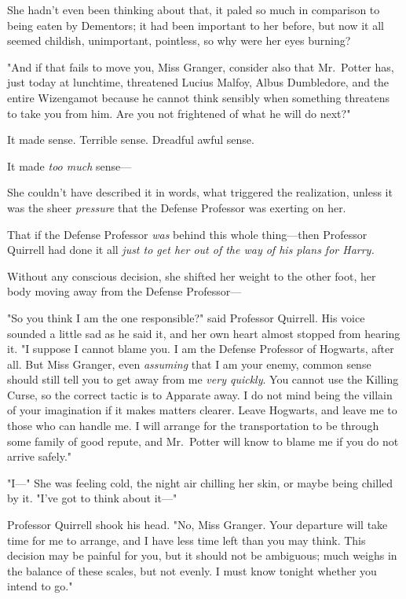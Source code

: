 She hadn't even been thinking about that, it paled so much in comparison to
being eaten by Dementors; it had been important to her before, but now it all
seemed childish, unimportant, pointless, so why were her eyes burning?

"And if that fails to move you, Miss Granger, consider also that Mr.~Potter
has, just today at lunchtime, threatened Lucius Malfoy, Albus Dumbledore, and
the entire Wizengamot because he cannot think sensibly when something threatens
to take you from him. Are you not frightened of what he will do next?"

It made sense. Terrible sense. Dreadful awful sense.

It made \emph{too much} sense---

She couldn't have described it in words, what triggered the realization, unless
it was the sheer \emph{pressure} that the Defense Professor was exerting on her.

That if the Defense Professor \emph{was} behind this whole thing---then
Professor Quirrell had done it all \emph{just to get her out of the way of his
plans for Harry.}

Without any conscious decision, she shifted her weight to the other foot, her
body moving away from the Defense Professor---

"So you think I am the one responsible?" said Professor Quirrell. His voice
sounded a little sad as he said it, and her own heart almost stopped from
hearing it. "I suppose I cannot blame you. I am the Defense Professor of
Hogwarts, after all. But Miss Granger, even \emph{assuming} that I am your
enemy, common sense should still tell you to get away from me \emph{very
quickly}. You cannot use the Killing Curse, so the correct tactic is to
Apparate away. I do not mind being the villain of your imagination if it makes
matters clearer. Leave Hogwarts, and leave me to those who can handle me. I
will arrange for the transportation to be through some family of good repute,
and Mr.~Potter will know to blame me if you do not arrive safely."

"I\mbox{---}" She was feeling cold, the night air chilling her skin, or maybe being
chilled by it. "I've got to think about it\mbox{---}"

Professor Quirrell shook his head. "No, Miss Granger. Your departure will take
time for me to arrange, and I have less time left than you may think. This
decision may be painful for you, but it should not be ambiguous; much weighs in
the balance of these scales, but not evenly. I must know tonight whether you
intend to go."

